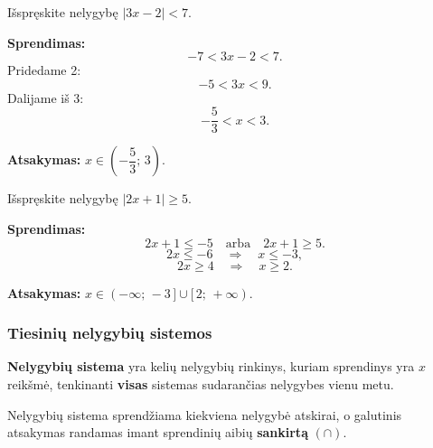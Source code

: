 \begin{example}
Išspręskite nelygybę $|3x - 2| < 7$.

\textbf{Sprendimas:}
\[
-7 < 3x - 2 < 7.
\]
Pridedame 2:
\[
-5 < 3x < 9.
\]
Dalijame iš 3:
\[
-\frac{5}{3} < x < 3.
\]

\textbf{Atsakymas:} $x \in \left(-\dfrac{5}{3};\, 3\right)$.
\end{example}

\begin{example}
Išspręskite nelygybę $|2x + 1| \geq 5$.

\textbf{Sprendimas:}
\[
2x + 1 \leq -5 \quad \text{arba} \quad 2x + 1 \geq 5.
\]
\[
2x \leq -6 \quad \Rightarrow \quad x \leq -3,
\]
\[
2x \geq 4 \quad \Rightarrow \quad x \geq 2.
\]

\textbf{Atsakymas:} $x \in (-\infty;\,-3\,] \cup [\,2;\,+\infty)$.
\end{example}

\subsubsection{Tiesinių nelygybių sistemos}

\begin{definition}
\textbf{Nelygybių sistema} yra kelių nelygybių rinkinys, kuriam sprendinys yra $x$ reikšmė, tenkinanti \textbf{visas} sistemas sudarančias nelygybes vienu metu.
\end{definition}

Nelygybių sistema sprendžiama kiekviena nelygybė atskirai, o galutinis atsakymas randamas imant sprendinių aibių \textbf{sankirtą} $(\cap)$.

